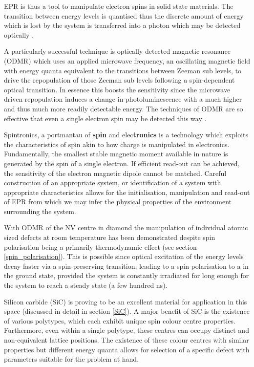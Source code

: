 EPR is thus a tool to manipulate electron spins in solid state materials. The transition between energy levels is quantised thus the discrete amount of energy which is lost by the system is transferred into a photon which may be detected optically \cite{carrington1967introduction}.

A particularly successful technique is optically detected magnetic resonance (ODMR) which uses an applied microwave frequency, an oscillating magnetic field with energy quanta equivalent to the transitions between Zeeman sub levels, to drive the repopulation of those Zeeman sub levels following a spin-dependent optical transition.
In essence this boosts the sensitivity since the microwave driven repopulation induces a change in photoluminescence with a much higher and thus much more readily detectable energy. The techniques of ODMR are so effective that even a single electron spin may be detected this way \cite{Khler1993}.

Spintronics, a portmantau of \textbf{spin} and elec\textbf{tronics} is a technology which exploits the characteristics of spin akin to how charge is manipulated in electronics. Fundamentally, the smallest stable magnetic moment available in nature is generated by the spin of a single electron. If efficient read-out can be achieved, the sensitivity of the electron magnetic dipole cannot be matched. 
Careful construction of an appropriate system, or identification of a system with appropriate characteristics allows for the initialisation, manipulation and read-out of EPR from which we may infer the physical properties of the environment surrounding the system. 

With ODMR of the NV centre in diamond the manipulation of individual atomic sized defects at room temperature has been demonstrated \cite{Levine} despite spin polarisation being a primarily thermodynamic effect (see section \ref{spin_polarisation}).
This is possible since optical excitation of the energy levels decay faster via a spin-preserving transition, leading to a spin polarisation to a in the ground state, provided the system is constantly irradiated for long enough for the system to reach a steady state (a few hundred ns).

Silicon carbide (SiC) is proving to be an excellent material for application in this space (discussed in detail in section \ref{SiC}). A major benefit of SiC is the existence of various polytypes, which each exhibit unique spin colour centre properties. Furthermore, even within a single polytype, these centres can occupy distinct and non-equivalent lattice positions.
The existence of these colour centres with similar properties but different energy quanta allows for selection of a specific defect with parameters suitable for the problem at hand. 

